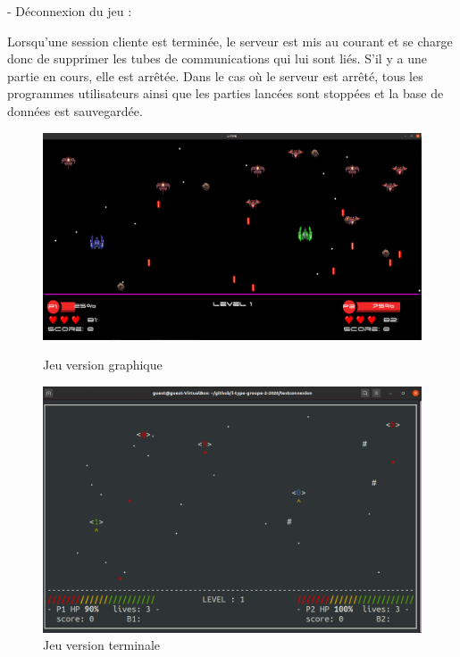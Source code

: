 \documentclass[a4paper,12pt]{article}
\begin{document}
- Déconnexion du jeu :

Lorsqu'une session cliente est terminée, le serveur est mis au courant et se charge donc de supprimer les tubes de communications qui lui sont liés. S'il y a une partie en cours, elle est arrêtée. 
Dans le cas où le serveur est arrêté, tous les programmes utilisateurs ainsi que les parties lancées sont stoppées et la base de données est sauvegardée. \\
\begin{figure}
\centering
\includegraphics[scale=0.21]{images/ingameGui.png}
\caption{Jeu version graphique}

\includegraphics[scale=0.34]{images/ingameTerm.png}
\caption{Jeu version terminale}
\end{figure}
\end{document}
